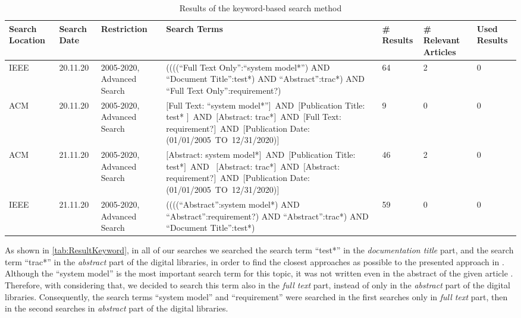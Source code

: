 \begin{table} [H] 
\begin{small}
  \begin{center}
  \begin{scriptsize}
\caption{Results of the keyword-based search method}
\label{tab:ResultKeyword}
\begin{tabular}{   m{1cm} | m{1cm} | m{1.6cm} | m{4.8cm} | m{1cm} | m{1.2cm} | m{0.7cm}  }
\hline
\textbf{Search Location} & \textbf{Search Date} & \textbf{Restriction}  & \textbf{Search Terms}  &  \textbf{\# Results}  & \textbf{\# Relevant Articles}  &  \textbf{Used Results} \\
\hline
IEEE & 20.11.20 & 2005-2020, Advanced Search & ((((\enquote{Full Text Only}:\enquote{system model*}) AND \enquote{Document Title}:test*) AND \enquote{Abstract}:trac*) AND \enquote{Full Text Only}:requirement?) & 64 & 2 & 0\\
\hline
ACM & 20.11.20 & 2005-2020, Advanced Search & $[$Full Text: \enquote{system model*}$]$ AND $[$Publication Title: test* $]$ AND $[$Abstract: trac*$]$ AND $[$Full Text: requirement?$]$ AND $[$Publication Date: (01/01/2005 TO 12/31/2020)$]$ & 9 & 0 & 0\\
\hline
ACM & 21.11.20 & 2005-2020, Advanced Search & $[$Abstract: system model*$]$ AND $[$Publication Title: test*$]$ AND  $[$Abstract: trac*$]$ AND $[$Abstract: requirement?$]$ AND $[$Publication Date: (01/01/2005 TO 12/31/2020)$]$ & 46 & 2 & 0 \\
\hline
IEEE & 21.11.20 & 2005-2020, Advanced Search & ((((\enquote{Abstract}:system model*) AND \enquote{Abstract}:requirement?) AND \enquote{Abstract}:trac*) AND \enquote{Document Title}:test*) & 59 & 0 & 0\\
\hline
\end{tabular}
\end{scriptsize}
 \end{center}
\end{small}
\end{table}
\newpage
As shown in \autoref{tab:ResultKeyword}, in all of our searches we searched the search term \enquote{test*}  in the \textit{documentation title} part, and the search term \enquote{trac*} in the \textit{abstract} part of the digital libraries, in order to find the closest approaches as possible to the presented approach in \cite{Paper1}. Although the \enquote{system model} is the most important search term for this topic, it was not written even in the abstract of the given article \cite{Paper1}. Therefore, with considering that, we decided to search this term also in the \textit{full text} part, instead of only in the \textit{abstract} part of the digital libraries. Consequently, the search terms \enquote{system model} and \enquote{requirement} were searched in the first searches only in \textit{full text} part, then in the second searches in \textit{abstract} part of the digital libraries. 

